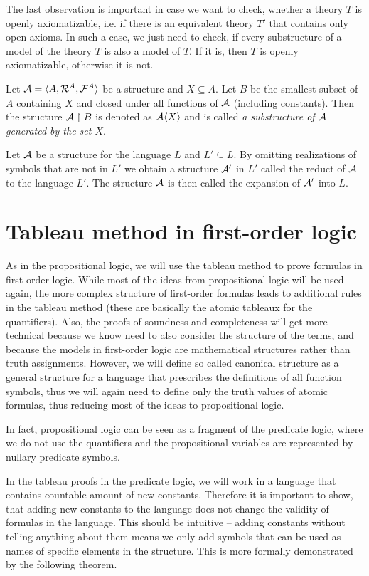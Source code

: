 The last observation is important in case we want to check, whether a theory $T$ is openly axiomatizable, i.e. if there is an equivalent theory $T'$ that contains only open axioms. In such a case, we just need to check, if every substructure of a model of the theory $T$ is also a model of $T$. If it is, then $T$ is openly axiomatizable, otherwise it is not.

Let $\mathcal{A} = \langle A, \mathcal{R}^A, \mathcal{F}^A \rangle$ be a structure and $X \subseteq A$. Let $B$ be the smallest subset of $A$ containing $X$ and closed under all functions of $\mathcal{A}$ (including constants). Then the structure $\mathcal{A} \upharpoonright B$ is denoted as $\mathcal{A}\langle X \rangle$ and is called \emph{a substructure of $\mathcal{A}$ generated by the set $X$}. 

Let $\mathcal{A}$ be a structure for the language $L$ and $L'\subseteq L$. By omitting realizations of symbols that are not in $L'$ we obtain a structure $\mathcal{A}'$ in $L'$ called the reduct of $\mathcal{A}$ to the language $L'$. The structure $\mathcal{A}$ is then called the expansion of $\mathcal{A}'$ into $L$.

\chapter{Tableau method in first-order logic}

As in the propositional logic, we will use the tableau method to prove formulas in first order logic. While most of the ideas from propositional logic will be used again, the more complex structure of first-order formulas leads to additional rules in the tableau method (these are basically the atomic tableaux for the quantifiers). Also, the proofs of soundness and completeness will get more technical because we know need to also consider the structure of the terms, and because the models in first-order logic are mathematical structures rather than truth assignments. However, we will define so called canonical structure as a general structure for a language that prescribes the definitions of all function symbols, thus we will again need to define only the truth values of atomic formulas, thus reducing most of the ideas to propositional logic.

In fact, propositional logic can be seen as a fragment of the predicate logic, where we do not use the quantifiers and the propositional variables are represented by nullary predicate symbols.

In the tableau proofs in the predicate logic, we will work in a language that contains countable amount of new constants. Therefore it is important to show, that adding new constants to the language does not change the validity of formulas in the language. This should be intuitive -- adding constants without telling anything about them means we only add symbols that can be used as names of specific elements in the structure. This is more formally demonstrated by the following theorem.

